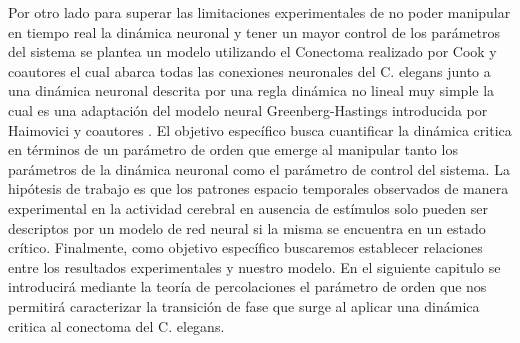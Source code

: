 Por otro lado para superar las limitaciones experimentales de no poder manipular en tiempo real la dinámica neuronal y  tener un mayor control de los parámetros del sistema se plantea un modelo utilizando  el Conectoma  realizado por Cook y coautores  \cite{cook_whole-animal_2019} el cual abarca  todas las conexiones  neuronales  del C. elegans  junto a una  dinámica neuronal descrita por una regla dinámica no lineal muy simple la cual es una  adaptación del modelo neural Greenberg-Hastings introducida por Haimovici y coautores  \cite{haimovici_brain_2013}.   El  objetivo específico busca cuantificar la dinámica critica  en términos de un parámetro de orden   que emerge al manipular tanto los parámetros de  la dinámica neuronal  como el parámetro de control del sistema.  La hipótesis de trabajo es que los patrones espacio temporales observados de manera experimental en la actividad cerebral en ausencia de estímulos  solo pueden ser descriptos por un modelo de red neural si la misma se encuentra en un estado crítico. Finalmente, como objetivo específico buscaremos establecer relaciones entre los resultados experimentales y  nuestro modelo. En el siguiente capitulo se introducirá  mediante la teoría de percolaciones  el parámetro de orden que  nos permitirá caracterizar la transición de fase que surge al aplicar una dinámica critica al conectoma del C. elegans. 









